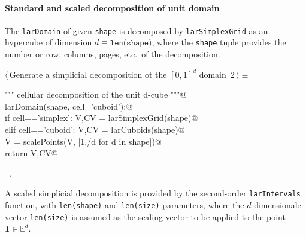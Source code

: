 \documentclass[11pt,oneside]{article}	%
\def\E{\mathbb{E}}
\begin{document}
\paragraph{Standard and scaled decomposition of unit domain}
The \texttt{larDomain} of given \texttt{shape} is decomposed by \texttt{larSimplexGrid} as an hypercube of dimension $d \equiv\texttt{len(shape)}$, where the \texttt{shape} tuple provides the number or row, columns, pages, etc.~of the decomposition.

\begin{flushleft} \small \label{scrap1}
\protect{}$\langle\,$Generate a simplicial decomposition ot the $[0,1]^d$ domain\nobreak\ {\footnotesize 2}$\,\rangle\equiv$
\vspace{-1ex}
\begin{list}{}{} \item
\mbox{}\verb@""" cellular decomposition of the unit d-cube """@\\
\mbox{}\verb@def larDomain(shape, cell='cuboid'):@\\
\mbox{}\verb@   if cell=='simplex': V,CV = larSimplexGrid(shape)@\\
\mbox{}\verb@   elif cell=='cuboid': V,CV = larCuboids(shape)@\\
\mbox{}\verb@   V = scalePoints(V, [1./d for d in shape])@\\
\mbox{}\verb@   return V,CV@\\
\mbox{}\verb@@{\NWsep}
\end{list}
\vspace{-1ex}
\footnotesize\addtolength{\baselineskip}{-1ex}
\begin{list}{}{\setlength{\itemsep}{-\parsep}\setlength{\itemindent}{-\leftmargin}}
\item \NWtxtMacroRefIn\ .
\end{list}
\end{flushleft}

A scaled simplicial decomposition is provided by the second-order  \texttt{larIntervals} function, with \texttt{len(shape)} and \texttt{len(size)} parameters, where the $d$-dimensionale vector \texttt{len(size)} is assumed as the scaling vector to be applied to the point $\mathbf{1}\in\E^d$.
\end{document}
